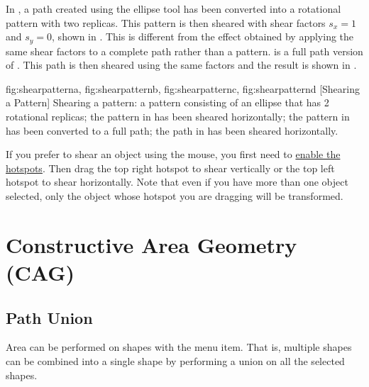 In , a \gls*{path} created using the
ellipse tool has been converted into a rotational pattern with two
replicas. This pattern is then sheared with shear factors $s_x=1$
and $s_y=0$, shown in . This is
different from the effect obtained by applying the same shear
factors to a complete path rather than a pattern.
 is a full path version of
. This path is then sheared using the
same factors and the result is shown in
.

{
 {fig:shearpatterna}{}{},
 {fig:shearpatternb}{}{},
 {fig:shearpatternc}{}{},
 {fig:shearpatternd}{}{}
}
[Shearing a Pattern]
{Shearing a pattern: 
 a pattern consisting of an
ellipse that has 2 rotational replicas; 
 the pattern 
in  has been sheared horizontally;
 the pattern 
in  has been converted to a full path; 
 the path 
in  has been sheared horizontally.}

If you prefer to shear an \gls{object} using the mouse,
you first need to \hyperref[mi:hotspots]{enable the hotspots}.
Then drag the top right hotspot to shear vertically
or the top left hotspot to shear horizontally. Note that even if you
have more than one object selected, only the object whose hotspot you
are dragging will be transformed.


\section{Constructive Area Geometry (CAG)}\label{sec:cag}

\subsection{Path Union}\label{sec:pathunion}


Area  can be performed on
\glspl{shape} with the  menu item. That is,
multiple \glspl{shape} can be combined into a single \gls*{shape} by
performing a union on all the selected \glspl*{shape}.

